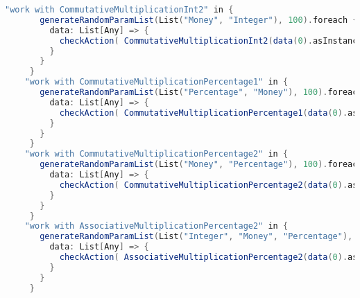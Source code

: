 \begin{sourcecode}[h!]
\begin{lstlisting}[language=Scala]
    "work with CommutativeMultiplicationInt2" in {
       generateRandomParamList(List("Money", "Integer"), 100).foreach {
         data: List[Any] => {
           checkAction( CommutativeMultiplicationInt2(data(0).asInstanceOf[Money], data(1).asInstanceOf[Int]) )
         }
       }
     }
    "work with CommutativeMultiplicationPercentage1" in {
       generateRandomParamList(List("Percentage", "Money"), 100).foreach {
         data: List[Any] => {
           checkAction( CommutativeMultiplicationPercentage1(data(0).asInstanceOf[Double], data(1).asInstanceOf[Money]) )
         }
       }
     }
    "work with CommutativeMultiplicationPercentage2" in {
       generateRandomParamList(List("Money", "Percentage"), 100).foreach {
         data: List[Any] => {
           checkAction( CommutativeMultiplicationPercentage2(data(0).asInstanceOf[Money], data(1).asInstanceOf[Double]) )
         }
       }
     }
    "work with AssociativeMultiplicationPercentage2" in {
       generateRandomParamList(List("Integer", "Money", "Percentage"), 100).foreach {
         data: List[Any] => {
           checkAction( AssociativeMultiplicationPercentage2(data(0).asInstanceOf[Int], data(1).asInstanceOf[Money], data(2).asInstanceOf[Double]) )
         }
       }
     }
\end{lstlisting}
\caption{The first generated test file. It uses random values as input for every test. Each test is run 100 times}
\end{sourcecode}

























